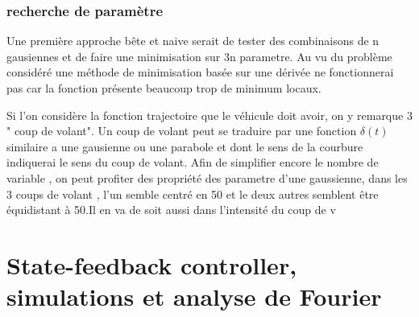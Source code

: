 \documentclass[11pt,a4paper]{article}
\begin{document}
\subsubsection{recherche de paramètre}


Une première approche bête et naive serait de tester des combinaisons de n gausiennes  et de faire une minimisation sur 3n parametre.
Au vu du problème considéré une méthode de minimisation basée sur une dérivée ne fonctionnerai pas car la fonction présente beaucoup trop de minimum locaux.

Si l'on considère la fonction trajectoire que le véhicule doit avoir, on y remarque 3 " coup de volant". Un coup de volant peut se traduire par une fonction $\delta(t) $
similaire a une gausienne ou une parabole et dont le sens de la courbure indiquerai le sens du coup de volant.
Afin de simplifier encore le nombre de variable , on peut profiter des propriété des parametre d'une gaussienne, dans les 3 coups de volant , l'un semble centré en 50 et le deux autres semblent être équidistant à 50.Il en va de soit aussi dans l'intensité du coup de v 

\section{State-feedback controller, simulations et analyse de Fourier}
\subsection{}
\end{document}
